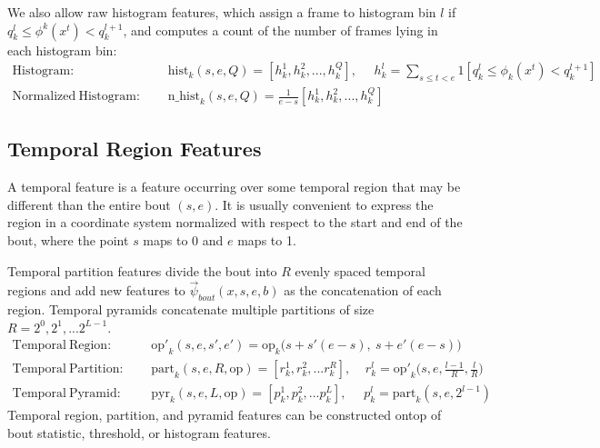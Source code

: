 \documentclass[10pt, onecolumn]{article}
\newcommand{\1}{\textbf{1}}
\begin{document}
We also allow raw histogram features, which assign a frame to histogram bin $l$ if $q_k^l \le \phi^k(x^t) < q_k^{l+1}$, and computes a count of the number of frames lying in each histogram bin: 
\begin{eqnarray*}
 \mathrm{Histogram:\ \ } && \mathrm{hist}_k(s,e,Q)=[h_k^1,h_k^2,...,h_k^Q],\ \ \ \ \ \ h_k^l = \sum\limits_{s \le t < e} 1[q_k^l \le \phi_k(x^t) < q_k^{l+1}]\\
 \mathrm{Normalized\ Histogram:\ \ } && \mathrm{n\_hist}_k(s,e,Q) = \frac{1}{e-s}[h_k^1,h_k^2,...,h_k^Q]
\end{eqnarray*}

\subsection{Temporal Region Features}
A temporal feature is a feature occurring over some temporal region that may be different than the entire bout $(s,e)$.  It is usually convenient to express the region in a coordinate system normalized with respect to the start and end of the bout, where the point $s$ maps to 0 and $e$ maps to 1.

Temporal partition features divide the bout into $R$ evenly spaced temporal regions and add new features to $\vec{\psi}_{bout}(x,s,e,b)$ as the concatenation of each region.  Temporal pyramids concatenate multiple partitions of size $R=2^0,2^1,...2^{L-1}$.
\begin{eqnarray*}
 \mathrm{Temporal\ Region:\ \ } &&\mathrm{op'}_k(s,e,s',e') = \mathrm{op}_k\bigg(s+s'(e-s),\ s+e'(e-s)\bigg)\\
 \mathrm{Temporal\ Partition:\ \ } &&\mathrm{part}_k(s,e,R,\mathrm{op}) = [r_k^1,r_k^2,...r_k^R],\ \ \ \ \ r_k^l = \mathrm{op'}_k\bigg(s,e,\frac{l-1}{R},\frac{l}{R} \bigg)\\
 \mathrm{Temporal\ Pyramid:\ \ } &&\mathrm{pyr}_k(s,e,L,\mathrm{op}) = [p_k^1,p_k^2,...p_k^L],\ \ \ \ \ \ p_k^l=\mathrm{part}_k(s,e,2^{l-1})
\end{eqnarray*}
Temporal region, partition, and pyramid features can be constructed ontop of bout statistic, threshold, or histogram features.
\end{document}
